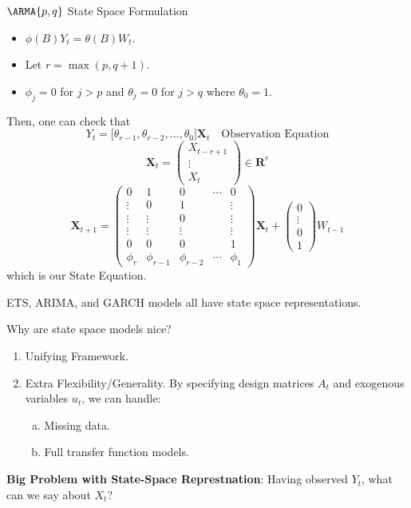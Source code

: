 \begin{Example}{$ \ARMA{p,q} $ State Space Formulation}{}
    \begin{itemize}
        \item $ \phi(B)Y_t=\theta(B)W_t $.
        \item Let $ r=\max(p,q+1) $.
        \item $ \phi_j=0 $ for $ j>p $ and $ \theta_j=0 $ for $ j>q $ where $ \theta_0=1 $.
    \end{itemize}
    Then, one can check that
    \[ Y_t=\bigl[\theta_{r-1},\theta_{r-2},\ldots,\theta_0\bigr]\symbf{X}_t\quad\text{Observation Equation} \]
    \[ \symbf{X}_t=\begin{pmatrix}
            X_{t-r+1} \\
            \vdots    \\
            X_t
        \end{pmatrix}\in\mathbf{R}^r \]
    \[ \symbf{X}_{t+1}=\begin{pmatrix}
            0      & 1          & 0          & \cdots & 0      \\
            \vdots & 0          & 1          &        & \vdots \\
            \vdots & \vdots     & 0          &        & \vdots \\
            \vdots & \vdots     & \vdots     &        & \vdots \\
            0      & 0          & 0          &        & 1      \\
            \phi_r & \phi_{r-1} & \phi_{r-2} & \cdots & \phi_1
        \end{pmatrix}\symbf{X}_t+\begin{pmatrix}
            0      \\
            \vdots \\
            0      \\
            1
        \end{pmatrix}W_{t-1} \]
    which is our State Equation.
\end{Example}
\begin{Remark}{}{}
    ETS, ARIMA, and GARCH models all have state space representations.
\end{Remark}
Why are state space models nice?
\begin{enumerate}[(1)]
    \item Unifying Framework.
    \item Extra Flexibility/Generality. By specifying design matrices $ A_t $
          and exogenous variables $ u_t $, we can handle:
          \begin{enumerate}[(a)]
              \item Missing data.
              \item Full transfer function models.
          \end{enumerate}
\end{enumerate}
\textbf{Big Problem with State-Space Represtnation}: Having observed $ Y_t $,
what can we say about $ X_t $?
